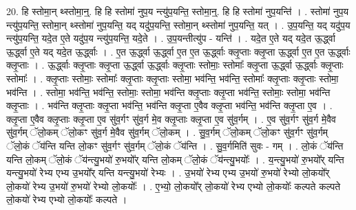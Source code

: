 \documentclass[17pt]{extarticle}
\begin{document}
20. हि स्तोमा॒न् थ्स्तोमा॒न्॒. हि हि स्तोमा॑ नुप॒य न्त्यु॑प॒यन्ति॒ स्तोमा॒न्॒. हि हि स्तोमा॑ नुप॒यन्ति॑ । . स्तोमा॑ नुप॒य न्त्यु॑प॒यन्ति॒ स्तोमा॒न् थ्स्तोमा॑ नुप॒यन्ति॒ यद् यदु॑प॒यन्ति॒ स्तोमा॒न् थ्स्तोमा॑ नुप॒यन्ति॒ यत् । . उ॒प॒यन्ति॒ यद् यदु॑प॒य न्त्यु॑प॒यन्ति॒ यदे॒त ए॒ते यदु॑प॒य न्त्यु॑प॒यन्ति॒ यदे॒ते । . उ॒प॒यन्तीत्यु॑प - यन्ति॑ । . यदे॒त ए॒ते यद् यदे॒त ऊ॒र्द्ध्वा ऊ॒र्द्ध्वा ए॒ते यद् यदे॒त ऊ॒र्द्ध्वाः । . ए॒त ऊ॒र्द्ध्वा ऊ॒र्द्ध्वा ए॒त ए॒त ऊ॒र्द्ध्वाः क्लृ॒प्ताः क्लृ॒प्ता ऊ॒र्द्ध्वा ए॒त ए॒त ऊ॒र्द्ध्वाः क्लृ॒प्ताः । . ऊ॒र्द्ध्वाः क्लृ॒प्ताः क्लृ॒प्ता ऊ॒र्द्ध्वा ऊ॒र्द्ध्वाः क्लृ॒प्ताः स्तोमाः॒ स्तोमाः᳚ क्लृ॒प्ता ऊ॒र्द्ध्वा ऊ॒र्द्ध्वाः क्लृ॒प्ताः स्तोमाः᳚ । . क्लृ॒प्ताः स्तोमाः॒ स्तोमाः᳚ क्लृ॒प्ताः क्लृ॒प्ताः स्तोमा॒ भव॑न्ति॒ भव॑न्ति॒ स्तोमाः᳚ क्लृ॒प्ताः क्लृ॒प्ताः स्तोमा॒ भव॑न्ति । . स्तोमा॒ भव॑न्ति॒ भव॑न्ति॒ स्तोमाः॒ स्तोमा॒ भव॑न्ति क्लृ॒प्ताः क्लृ॒प्ता भव॑न्ति॒ स्तोमाः॒ स्तोमा॒ भव॑न्ति क्लृ॒प्ताः । . भव॑न्ति क्लृ॒प्ताः क्लृ॒प्ता भव॑न्ति॒ भव॑न्ति क्लृ॒प्ता ए॒वैव क्लृ॒प्ता भव॑न्ति॒ भव॑न्ति क्लृ॒प्ता ए॒व । . क्लृ॒प्ता ए॒वैव क्लृ॒प्ताः क्लृ॒प्ता ए॒व सु॑व॒र्गꣳ सु॑व॒र्ग मे॒व क्लृ॒प्ताः क्लृ॒प्ता ए॒व सु॑व॒र्गम् । . ए॒व सु॑व॒र्गꣳ सु॑व॒र्ग मे॒वैव सु॑व॒र्गम् ॅलो॒कम् ॅलो॒कꣳ सु॑व॒र्ग मे॒वैव सु॑व॒र्गम् ॅलो॒कम् । . सु॒व॒र्गम् ॅलो॒कम् ॅलो॒कꣳ सु॑व॒र्गꣳ सु॑व॒र्गम् ॅलो॒कं ॅय॑न्ति यन्ति लो॒कꣳ सु॑व॒र्गꣳ सु॑व॒र्गम् ॅलो॒कं ॅय॑न्ति । . सु॒व॒र्गमिति॑ सुवः - गम् । . लो॒कं ॅय॑न्ति यन्ति लो॒कम् ॅलो॒कं ॅय॑न्त्यु॒भयो॑ रु॒भयो᳚र् यन्ति लो॒कम् ॅलो॒कं ॅय॑न्त्यु॒भयोः᳚ । . य॒न्त्यु॒भयो॑ रु॒भयो᳚र् यन्ति यन्त्यु॒भयो॑ रेभ्य एभ्य उ॒भयो᳚र् यन्ति यन्त्यु॒भयो॑ रेभ्यः । . उ॒भयो॑ रेभ्य एभ्य उ॒भयो॑ रु॒भयो॑ रेभ्यो लो॒कयो᳚र् लो॒कयो॑ रेभ्य उ॒भयो॑ रु॒भयो॑ रेभ्यो लो॒कयोः᳚ । . ए॒भ्यो॒ लो॒कयो᳚र् लो॒कयो॑ रेभ्य एभ्यो लो॒कयोः᳚ कल्पते कल्पते लो॒कयो॑ रेभ्य एभ्यो लो॒कयोः᳚ कल्पते । \newline
\end{document}
